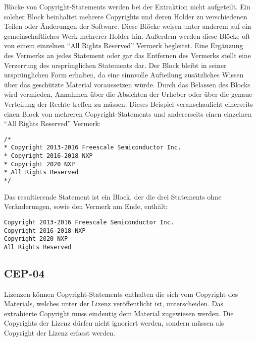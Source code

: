 Blöcke von Copyright-Statements werden bei der Extraktion nicht aufgeteilt.
Ein solcher Block beinhaltet mehrere Copyrights und deren Holder zu verschiedenen Teilen oder Änderungen der Software.
Diese Blöcke weisen unter anderem auf ein gemeinschaftliches Werk mehrerer Holder hin.
Außerdem werden diese Blöcke oft von einem einzelnen \enquote{All Rights Reserved} Vermerk begleitet.
Eine Ergänzung des Vermerks an jedes Statement oder gar das Entfernen des Vermerks stellt eine Verzerrung des ursprünglichen Statements dar.
Der Block bleibt in seiner ursprünglichen Form erhalten, da eine sinnvolle Aufteilung zusätzliches Wissen über das geschützte Material voraussetzen würde.
Durch das Belassen des Blocks wird vermieden, Annahmen über die Absichten der Urheber oder über die genaue Verteilung der Rechte treffen zu müssen.
Dieses Beispiel veranschaulicht einerseits einen Block von mehreren Copyright-Statements und andererseits einen einzelnen \enquote{All Rights Reserved} Vermerk:

\begin{lstlisting}[numbers=none, keepspaces=true]
/*
* Copyright 2013-2016 Freescale Semiconductor Inc.
* Copyright 2016-2018 NXP
* Copyright 2020 NXP
* All Rights Reserved
*/
\end{lstlisting}

Das resultierende Statement ist ein Block, der die drei Statements ohne Veränderungen, sowie den Vermerk am Ende, enthält:

\begin{lstlisting}[numbers=none, keepspaces=true]
Copyright 2013-2016 Freescale Semiconductor Inc.
Copyright 2016-2018 NXP
Copyright 2020 NXP
All Rights Reserved
\end{lstlisting}


\subsection{CEP-04}\label{subsec:cep-04}

Lizenzen können Copyright-Statements enthalten die sich vom Copyright des Materials, welches unter der Lizenz veröffentlicht ist, unterscheiden.
Das extrahierte Copyright muss eindeutig dem Material zugewiesen werden.
Die Copyrights der Lizenz dürfen nicht ignoriert werden, sondern müssen als Copyright der Lizenz erfasst werden.


